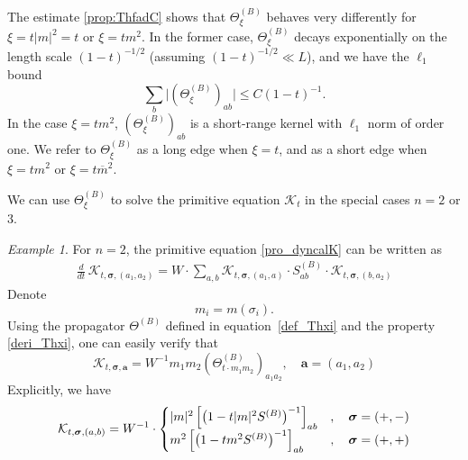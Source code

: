 \documentclass[10pt,reqno]{article}
\renewcommand{\bar}{\overline}
\theoremstyle{plain} %
\theoremstyle{remark}
\newtheorem{example}[theorem]{Example}
\numberwithin{equation}{section}
\begin{document}
 The estimate \eqref{prop:ThfadC} shows that $\Theta^{(B)}_{\xi}$ behaves very differently for $\xi = t|m|^2=t$ or $\xi = tm^2$. In the former case, 
$\Theta^{(B)}_{\xi}$ decays exponentially on the length scale $(1-t)^{-1/2}$ (assuming $(1-t)^{-1/2} \ll L$), and we have the $\ell_1$ bound
\[
\sum_b \Big | (\Theta^{(B)}_{\xi})_{ab} \Big | \le C (1-t)^{-1}.
\]
In the case $\xi = tm^2$, $(\Theta^{(B)}_{\xi})_{ab}$ is a short-range kernel with $\ell_1$ norm of order one. We refer to $\Theta^{(B)}_{\xi}$ as a long edge when $\xi=t$, and as a short edge when $\xi=tm^2$ or $\xi=t\bar m^2$.
  

We can  use $\Theta^{(B)}_\xi$ to solve  the primitive equation  $\mathcal{K}_t$ in the special cases $n = 2$ or $ 3$.

\begin{example} %
For  $n = 2$, the  primitive  equation  \eqref{pro_dyncalK} can be written as 
\begin{align}
    \frac{d}{dt}\, \mathcal{K}_{t, \boldsymbol{\sigma}, (a_1, a_2)} = W \cdot \sum_{a, b} \mathcal{K}_{t, \boldsymbol{\sigma}, (a_1, a)} \cdot S^{(B)}_{ab} \cdot \mathcal{K}_{t, \boldsymbol{\sigma}, (b, a_2)}
\end{align}
Denote 
\begin{equation}\label{eq_defm_i}
    m_i = m(\sigma_i).
\end{equation}
Using the propagator  $\Theta^{(B)}$ defined in equation~\eqref{def_Thxi} and the property \eqref{deri_Thxi}, one can easily verify that
\begin{equation}\label{Kn2sol}
    \mathcal{K}_{t, \boldsymbol{\sigma}, \textbf{a}} = W^{-1} m_1 m_2 \left(\Theta^{(B)}_{t \cdot m_1 m_2}\right)_{a_1 a_2}, \quad \textbf{a} = (a_1, a_2)
\end{equation}
Explicitly, we have 
\begin{equation}\label{Kn2sol2}
{\cal K}_{t,\boldsymbol{\sigma},(a,b)}
=   W^{-1} \cdot \begin{cases}
     |m |^2\left[\left(1- {  t }|m |^2 S^{(B)}\right)^{-1}\right]_{ab} &, \quad \boldsymbol{\sigma}=(+,-)\\
  m^2\left[\left(1- {  t } m^2 S^{(B)}\right)^{-1}\right]_{ab}  &, \quad \boldsymbol{\sigma}=(+,+)    
\end{cases}
\end{equation}


\end{example}
\end{document}

